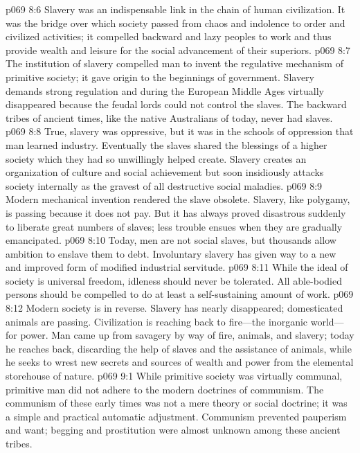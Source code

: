\pc \vs p069 8:6 Slavery was an indispensable link in the chain of human civilization. It was the bridge over which society passed from chaos and indolence to order and civilized activities; it compelled backward and lazy peoples to work and thus provide wealth and leisure for the social advancement of their superiors.
\vs p069 8:7 The institution of slavery compelled man to invent the regulative mechanism of primitive society; it gave origin to the beginnings of government. Slavery demands strong regulation and during the European Middle Ages virtually disappeared because the feudal lords could not control the slaves. The backward tribes of ancient times, like the native Australians of today, never had slaves.
\vs p069 8:8 True, slavery was oppressive, but it was in the schools of oppression that man learned industry. Eventually the slaves shared the blessings of a higher society which they had so unwillingly helped create. Slavery creates an organization of culture and social achievement but soon insidiously attacks society internally as the gravest of all destructive social maladies.
\pc \vs p069 8:9 Modern mechanical invention rendered the slave obsolete. Slavery, like polygamy, is passing because it does not pay. But it has always proved disastrous suddenly to liberate great numbers of slaves; less trouble ensues when they are gradually emancipated.
\pc \vs p069 8:10 Today, men are not social slaves, but thousands allow ambition to enslave them to debt. Involuntary slavery has given way to a new and improved form of modified industrial servitude.
\vs p069 8:11 While the ideal of society is universal freedom, idleness should never be tolerated. All able\hyp{}bodied persons should be compelled to do at least a self\hyp{}sustaining amount of work.
\vs p069 8:12 Modern society is in reverse. Slavery has nearly disappeared; domesticated animals are passing. Civilization is reaching back to fire---the inorganic world---for power. Man came up from savagery by way of fire, animals, and slavery; today he reaches back, discarding the help of slaves and the assistance of animals, while he seeks to wrest new secrets and sources of wealth and power from the elemental storehouse of nature.
\vs p069 9:1 While primitive society was virtually communal, primitive man did not adhere to the modern doctrines of communism. The communism of these early times was not a mere theory or social doctrine; it was a simple and practical automatic adjustment. Communism prevented pauperism and want; begging and prostitution were almost unknown among these ancient tribes.
